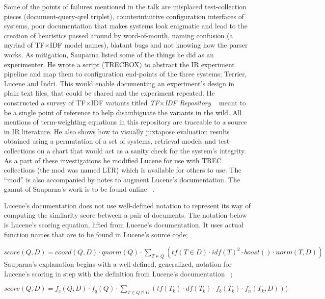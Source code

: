 Some of the points of failures mentioned in the talk are misplaced
test-collection pieces (document-query-qrel triplet), counterintuitive
configuration interfaces of systems, poor documentation that makes
systems look enigmatic and lead to the creation of heuristics passed
around by word-of-mouth, naming confusion (a myriad of TF$\times$IDF model
names), blatant bugs and not knowing how the parser works. As
mitigation, Sauparna listed some of the things he did as an
experimenter. He wrote a script (TRECBOX) to abstract the IR
experiment pipeline and map them to configuration end-points of the
three systems; Terrier, Lucene and Indri. This would enable
documenting an experiment's design in plain text files, that could be
shared and the experiment repeated. He constructed a survey of TF$\times$IDF
variants titled \emph{TF$\times$IDF Repository} ~\cite{rup:TFXIDFRepository}
meant to be a single point of reference to help disambiguate the
variants in the wild. All mentions of term-weighting equations in this
repository are traceable to a source in IR literature. He also shows
how to visually juxtapose evaluation results obtained using a
permutation of a set of systems, retrieval models and test-collections
on a chart that would act as a sanity check for the system's
integrity. As a part of these investigations he modified Lucene for
use with TREC collections (the mod was named LTR) which is available
for others to use. The ``mod'' is also accompanied by notes to augment
Lucene's documentation. The gamut of Sauparna's work is to be found
online ~\cite{rup:IR}.

Lucene's documentation does not use well-defined notation to represent
its way of computing the similarity score between a pair of
documents. The notation below is Lucene's scoring equation, lifted
from Lucene's documentation. It uses actual function names that are to
be found in Lucene's source code;

$score(Q,D) = coord(Q,D) \cdot qnorm(Q) \cdot \displaystyle\sum_{T \in Q} (tf(T \in D) \cdot idf(T)^2 \cdot boost() \cdot norm(T, D))$\\

Sauparna's explanation begins with a well-defined, generalized,
notation for Lucene's scoring in step with the definition from
Lucene's documentation ~\cite{Lucene:6.2.1:Scoring};

$score(Q,D) = f_{c}(Q,D) \cdot f_{q}(Q) \cdot \displaystyle\sum_{T \in Q \cap D}(tf(T_{k}) \cdot df(T_{k}) \cdot f_{b}(T_{k}) \cdot f_{n}(T_{k},D)))$\\

